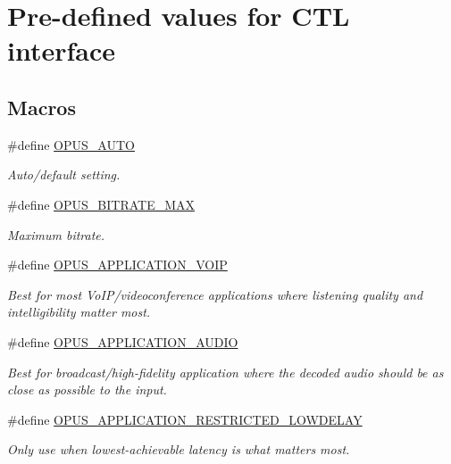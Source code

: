 \hypertarget{group__opus__ctlvalues}{}\section{Pre-\/defined values for C\+TL interface}
\label{group__opus__ctlvalues}
\subsection*{Macros}
\begin{DoxyCompactItemize}
\item 
\#define \hyperlink{group__opus__ctlvalues_ga1c5b3244b018ff4548d2d6bffa418472}{O\+P\+U\+S\+\_\+\+A\+U\+TO}
\begin{DoxyCompactList}\small\item\em Auto/default setting. \end{DoxyCompactList}\item 
\#define \hyperlink{group__opus__ctlvalues_gaeadbaa3b4b9e15d39cd1d6e7d91519e5}{O\+P\+U\+S\+\_\+\+B\+I\+T\+R\+A\+T\+E\+\_\+\+M\+AX}
\begin{DoxyCompactList}\small\item\em Maximum bitrate. \end{DoxyCompactList}\item 
\#define \hyperlink{group__opus__ctlvalues_ga07884aa018303a419d1f7acb2f3fa669}{O\+P\+U\+S\+\_\+\+A\+P\+P\+L\+I\+C\+A\+T\+I\+O\+N\+\_\+\+V\+O\+IP}
\begin{DoxyCompactList}\small\item\em Best for most Vo\+I\+P/videoconference applications where listening quality and intelligibility matter most. \end{DoxyCompactList}\item 
\#define \hyperlink{group__opus__ctlvalues_ga5909f7cb35c04f1110026c6889edd345}{O\+P\+U\+S\+\_\+\+A\+P\+P\+L\+I\+C\+A\+T\+I\+O\+N\+\_\+\+A\+U\+D\+IO}
\begin{DoxyCompactList}\small\item\em Best for broadcast/high-\/fidelity application where the decoded audio should be as close as possible to the input. \end{DoxyCompactList}\item 
\#define \hyperlink{group__opus__ctlvalues_ga592232fb39db60c1369989c5c5d19a07}{O\+P\+U\+S\+\_\+\+A\+P\+P\+L\+I\+C\+A\+T\+I\+O\+N\+\_\+\+R\+E\+S\+T\+R\+I\+C\+T\+E\+D\+\_\+\+L\+O\+W\+D\+E\+L\+AY}
\begin{DoxyCompactList}\small\item\em Only use when lowest-\/achievable latency is what matters most. \end{DoxyCompactList}\item 

\end{DoxyCompactItemize}
